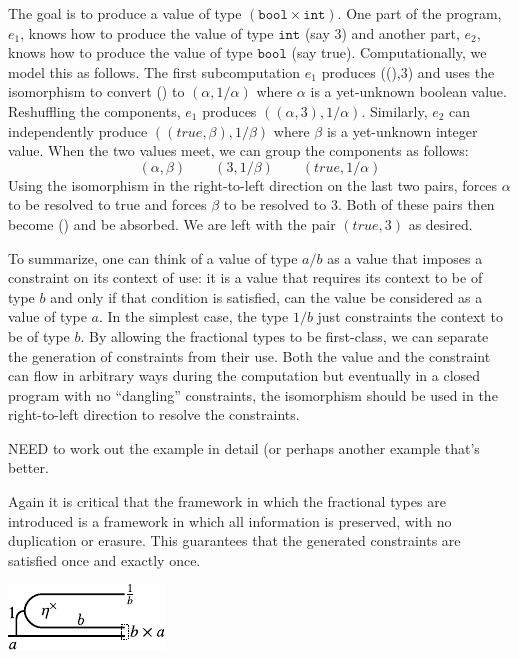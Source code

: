 \documentclass[preprint]{sigplanconf}
\begin{document}
The goal is to produce a value of type $(\texttt{bool} \times
\texttt{int})$. One part of the program, $e_1$, knows how to produce the
value of type $\texttt{int}$ (say {{3}}) and another part, $e_2$, knows how
to produce the value of type $\texttt{bool}$ (say true). Computationally, we
model this as follows. The first subcomputation $e_1$ produces {{((),3)}} and
uses the isomorphism to convert {{()}} to $(\alpha,1/\alpha)$ where $\alpha$
is a yet-unknown boolean value. Reshuffling the components, $e_1$ produces
$((\alpha,3), 1/\alpha)$. Similarly, $e_2$ can independently produce
$((true,\beta),1/\beta)$ where $\beta$ is a yet-unknown integer value.  When
the two values meet, we can group the components as follows:
\[
(\alpha,\beta)  \qquad (3,1/\beta)  \qquad (true,1/\alpha)
\]
Using the isomorphism in the right-to-left direction on the last two pairs,
forces $\alpha$ to be resolved to true and forces $\beta$ to be resolved to
{{3}}. Both of these pairs then become {{()}} and be absorbed. We are left
with the pair $(true,3)$ as desired.

To summarize, one can think of a value of type $a/b$ as a value that imposes
a constraint on its context of use: it is a value that requires its context
to be of type $b$ and only if that condition is satisfied, can the value be
considered as a value of type $a$. In the simplest case, the type $1/b$ just
constraints the context to be of type $b$. By allowing the fractional types
to be first-class, we can separate the generation of constraints from their
use. Both the value and the constraint can flow in arbitrary ways during the
computation but eventually in a closed program with no ``dangling''
constraints, the isomorphism should be used in the right-to-left direction to
resolve the constraints.

NEED to work out the example in detail (or perhaps another example that's
better. 

Again it is critical that the framework in which the fractional types are
introduced is a framework in which all information is preserved, with no
duplication or erasure. This guarantees that the generated constraints are
satisfied once and exactly once. 

\begin{center}
  \includegraphics{diagrams/algebra2.pdf}
\end{center}
\end{document}

